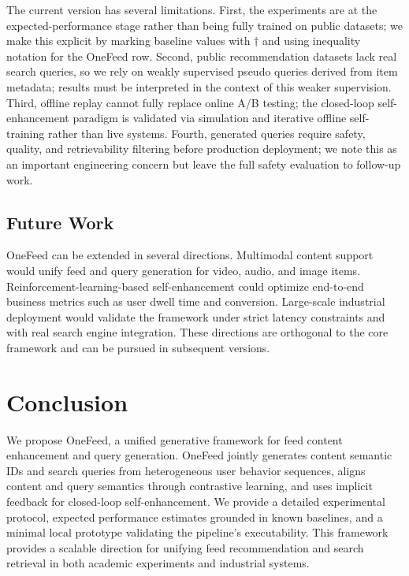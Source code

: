 \documentclass[11pt]{article}
\begin{document}
The current version has several limitations. First, the experiments are at the expected-performance stage rather than being fully trained on public datasets; we make this explicit by marking baseline values with $\dagger$ and using inequality notation for the OneFeed row. Second, public recommendation datasets lack real search queries, so we rely on weakly supervised pseudo queries derived from item metadata; results must be interpreted in the context of this weaker supervision. Third, offline replay cannot fully replace online A/B testing; the closed-loop self-enhancement paradigm is validated via simulation and iterative offline self-training rather than live systems. Fourth, generated queries require safety, quality, and retrievability filtering before production deployment; we note this as an important engineering concern but leave the full safety evaluation to follow-up work.

\subsection{Future Work}

OneFeed can be extended in several directions. Multimodal content support would unify feed and query generation for video, audio, and image items. Reinforcement-learning-based self-enhancement could optimize end-to-end business metrics such as user dwell time and conversion. Large-scale industrial deployment would validate the framework under strict latency constraints and with real search engine integration. These directions are orthogonal to the core framework and can be pursued in subsequent versions.

\section{Conclusion}

We propose OneFeed, a unified generative framework for feed content enhancement and query generation. OneFeed jointly generates content semantic IDs and search queries from heterogeneous user behavior sequences, aligns content and query semantics through contrastive learning, and uses implicit feedback for closed-loop self-enhancement. We provide a detailed experimental protocol, expected performance estimates grounded in known baselines, and a minimal local prototype validating the pipeline's executability. This framework provides a scalable direction for unifying feed recommendation and search retrieval in both academic experiments and industrial systems.
\end{document}
